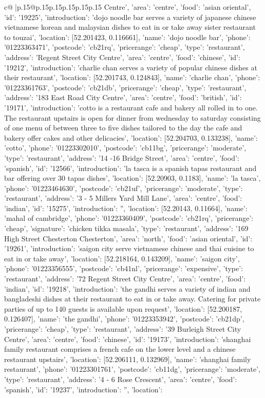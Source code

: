 \documentclass{article}
\begin{document}
{\begin{supertabular}{c@{$\;$}|p{.15\linewidth}@{}p{.15\linewidth}p{.15\linewidth}p{.15\linewidth}p{.15\linewidth}p{.15\linewidth}}
{{{Centre', 'area': 'centre', 'food': 'asian oriental', 'id': '19225', 'introduction': 'dojo noodle bar serves a variety of japanese chinese vietnamese korean and malaysian dishes to eat in or take away sister restaurant to touzai', 'location': [52.201423, 0.116661], 'name': 'dojo noodle bar', 'phone': '01223363471', 'postcode': 'cb21rq', 'pricerange': 'cheap', 'type': 'restaurant'}, {'address': 'Regent Street City Centre', 'area': 'centre', 'food': 'chinese', 'id': '19212', 'introduction': 'charlie chan serves a variety of popular chinese dishes at their restaurant', 'location': [52.201743, 0.124843], 'name': 'charlie chan', 'phone': '01223361763', 'postcode': 'cb21db', 'pricerange': 'cheap', 'type': 'restaurant'}, {'address': '183 East Road City Centre', 'area': 'centre', 'food': 'british', 'id': '19171', 'introduction': 'cotto is a restaurant cafe and bakery all rolled in to one. The restaurant upstairs is open for dinner from wednesday to saturday consisting of one menu of between three to five dishes tailored to the day the cafe and bakery offer cakes and other delicacies', 'location': [52.204703, 0.133238], 'name': 'cotto', 'phone': '01223302010', 'postcode': 'cb11bg', 'pricerange': 'moderate', 'type': 'restaurant'}, {'address': '14 -16 Bridge Street', 'area': 'centre', 'food': 'spanish', 'id': '12566', 'introduction': 'la tasca is a spanish tapas restaurant and bar offering over 30 tapas dishes', 'location': [52.20903, 0.1183], 'name': 'la tasca', 'phone': '01223464630', 'postcode': 'cb21uf', 'pricerange': 'moderate', 'type': 'restaurant'}, {'address': '3 - 5 Millers Yard Mill Lane', 'area': 'centre', 'food': 'indian', 'id': '15275', 'introduction': '', 'location': [52.20143, 0.11664], 'name': 'mahal of cambridge', 'phone': '01223360409', 'postcode': 'cb21rq', 'pricerange': 'cheap', 'signature': 'chicken tikka masala', 'type': 'restaurant'}, {'address': '169 High Street Chesterton Chesterton', 'area': 'north', 'food': 'asian oriental', 'id': '19261', 'introduction': 'saigon city serve vietnamese chinese and thai cuisine to eat in or take away', 'location': [52.218164, 0.143209], 'name': 'saigon city', 'phone': '01223356555', 'postcode': 'cb41nl', 'pricerange': 'expensive', 'type': 'restaurant'}, {'address': '72 Regent Street City Centre', 'area': 'centre', 'food': 'indian', 'id': '19218', 'introduction': 'the gandhi serves a variety of indian and bangladeshi dishes at their restaurant to eat in or take away. Catering for private parties of up to 140 guests is available upon request', 'location': [52.200187, 0.126407], 'name': 'the gandhi', 'phone': '01223353942', 'postcode': 'cb21dp', 'pricerange': 'cheap', 'type': 'restaurant'}, {'address': '39 Burleigh Street City Centre', 'area': 'centre', 'food': 'chinese', 'id': '19173', 'introduction': 'shanghai family restaurant comprises a french cafe on the lower level and a chinese restaurant upstairs', 'location': [52.206111, 0.132969], 'name': 'shanghai family restaurant', 'phone': '01223301761', 'postcode': 'cb11dg', 'pricerange': 'moderate', 'type': 'restaurant'}, {'address': '4 - 6 Rose Crescent', 'area': 'centre', 'food': 'spanish', 'id': '19237', 'introduction': '', 'location': }}}
\end{supertabular}}
\end{document}
